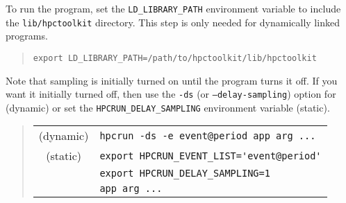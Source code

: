 To run the program, set the \verb|LD_LIBRARY_PATH| environment
variable to include the \HPCToolkit{} {\tt lib/hpctoolkit} directory.
This step is only needed for dynamically linked programs.

\begin{quote}
\begin{verbatim}
export LD_LIBRARY_PATH=/path/to/hpctoolkit/lib/hpctoolkit
\end{verbatim}
\end{quote}

Note that sampling is initially turned on until the program turns it
off.  If you want it initially turned off, then use the {\tt -ds} (or
{\tt --delay-sampling}) option for \hpcrun{} (dynamic) or set the
\verb|HPCRUN_DELAY_SAMPLING| environment variable (static).

\begin{quote}
\begin{tabular}{@{}cl}
(dynamic) & \verb|hpcrun -ds -e event@period app arg ...|  \\
(static)  & \verb|export HPCRUN_EVENT_LIST='event@period'| \\
& \verb|export HPCRUN_DELAY_SAMPLING=1| \\
& \verb|app arg ...|
\end{tabular}
\end{quote}

